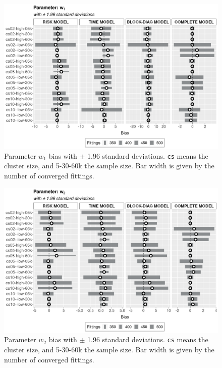 \documentclass[a4paper,12pt]{article}
\begin{document}
\vspace{-0.514cm}
\begin{figure}[H]
 \centering
 \includegraphics[width=\linewidth]{pics/bias2plotsd-5.png}
 \vspace{-0.75cm}
 \caption{Parameter \(w_{1}\) bias with \(\pm\) 1.96 standard
   deviations. \texttt{cs} means the cluster size, and 5-30-60k the
   sample size. Bar width is given by the number of converged fittings.}
 \label{fig:biassdw1}
\end{figure}

\begin{figure}[H]
 \centering
 \includegraphics[width=\linewidth]{pics/bias2plotsd-6.png}
 \vspace{-0.75cm}
 \caption{Parameter \(w_{2}\) bias with \(\pm\) 1.96 standard
   deviations. \texttt{cs} means the cluster size, and 5-30-60k the
   sample size. Bar width is given by the number of converged fittings.}
 \label{fig:biassdw2}
\end{figure}
\end{document}
